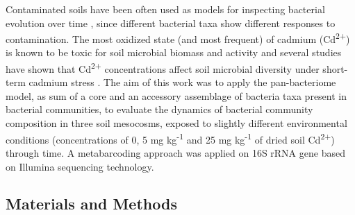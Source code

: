 Contaminated soils have been often used as models for inspecting bacterial evolution over time \cite{mengoni2010plants, porter2013trade}, since different bacterial taxa show different responses to contamination. The most oxidized state (and most frequent) of cadmium (Cd\textsuperscript{2+}) is known to be toxic for soil microbial biomass and activity \cite{renella2002cadmium, renella2005microbial} and several studies have shown that Cd\textsuperscript{2+} concentrations affect soil microbial diversity under short-term cadmium stress \cite{gomes2010effects, lorenz2006response, chien2008microbial, duan2008effect, lazzaro2008identification, sheoran2008remediation, zhang2009responses, fritze2000effect}. The aim of this work was to apply the pan-bacteriome model, as sum of a core and an accessory assemblage of bacteria taxa present in bacterial communities, to evaluate the dynamics of bacterial community composition in three soil mesocosms, exposed to slightly different environmental conditions (concentrations of 0, 5 mg kg\textsuperscript{-1} and 25 mg kg\textsuperscript{-1} of dried soil Cd\textsuperscript{2+}) through time. A metabarcoding approach was applied on 16S rRNA gene based on Illumina sequencing technology.\\

\subsection{Materials and Methods}


